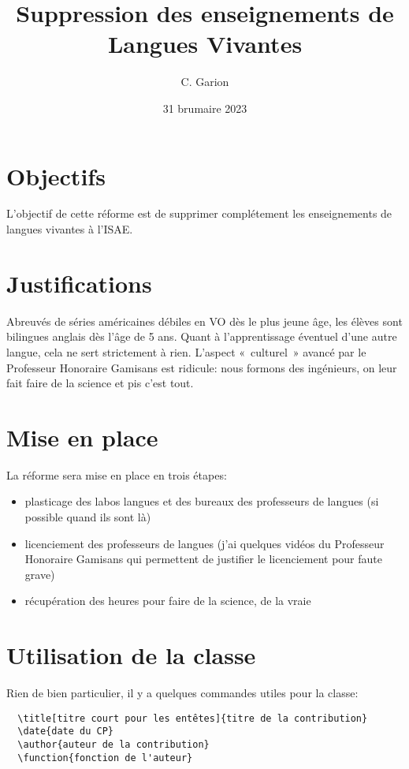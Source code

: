 \documentclass[fr]{supaero-note-cf}
\begin{document}
\title{Suppression des enseignements de Langues Vivantes}
\author{C. Garion}
\date{31 brumaire 2023}

\section{Objectifs}
\label{sec:objectifs}

L'objectif de cette réforme est de supprimer complétement les
enseignements de langues vivantes à l'ISAE.

\section{Justifications}
\label{sec:justifications}

Abreuvés de séries américaines débiles en VO dès le plus jeune âge,
les élèves sont bilingues anglais dès l'âge de 5 ans. Quant à
l'apprentissage éventuel d'une autre langue, cela ne sert strictement
à rien. L'aspect «~culturel~» avancé par le Professeur Honoraire
Gamisans est ridicule: nous formons des ingénieurs, on leur fait faire
de la science et pis c'est tout.

\section{Mise en place}
\label{sec:mise-en-place}

La réforme sera mise en place en trois étapes:

\begin{itemize}
\item plasticage des labos langues et des bureaux des professeurs de
  langues (si possible quand ils sont là)
\item licenciement des professeurs de langues (j'ai quelques vidéos du
  Professeur Honoraire Gamisans qui permettent de justifier le
  licenciement pour faute grave)
\item récupération des heures pour faire de la science, de la vraie
\end{itemize}

\section{Utilisation de la classe}
\label{sec:utilisation-de-la}

Rien de bien particulier, il y a quelques commandes utiles pour la
classe:

\begin{verbatim}
  \title[titre court pour les entêtes]{titre de la contribution}
  \date{date du CP}
  \author{auteur de la contribution}
  \function{fonction de l'auteur}
\end{verbatim}
\end{document}
